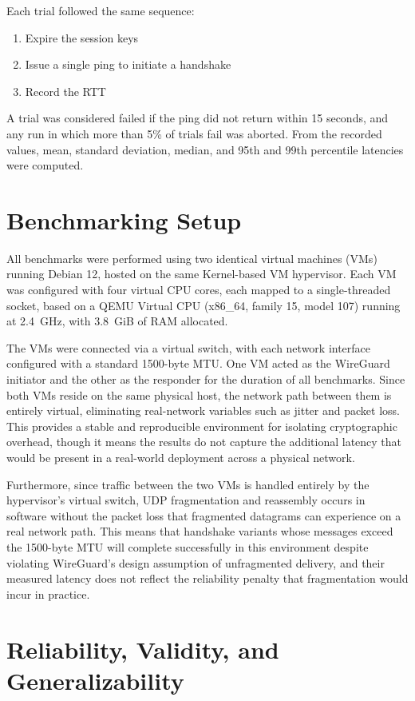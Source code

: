 Each trial followed the same sequence: 
\begin{enumerate}
    \item Expire the session keys
    \item Issue a single ping to initiate a handshake
    \item Record the RTT
\end{enumerate} 
A trial was considered failed if the ping did not return within 15 seconds, and any run in which more than 5\% of trials fail was aborted. From the recorded values, mean, standard deviation, median, and 95th and 99th percentile latencies were computed.


\section{Benchmarking Setup}\label{sec:benchmark}
All benchmarks were performed using two identical virtual machines (VMs) running Debian 12, hosted on the same Kernel-based VM hypervisor. Each VM was configured with four virtual CPU cores, each mapped to a single-threaded socket, based on a QEMU Virtual CPU (x86\_64, family 15, model 107) running at \qty{2.4}{GHz}, with \qty{3.8}{GiB} of RAM allocated. 

The VMs were connected via a virtual switch, with each network interface configured with a standard 1500-byte MTU. One VM acted as the WireGuard initiator and the other as the responder for the duration of all benchmarks. Since both VMs reside on the same physical host, the network path between them is entirely virtual, eliminating real-network variables such as jitter and packet loss. This provides a stable and reproducible environment for isolating cryptographic overhead, though it means the results do not capture the additional latency that would be present in a real-world deployment across a physical network.

Furthermore, since traffic between the two VMs is handled entirely by the hypervisor's virtual switch, UDP fragmentation and reassembly occurs in software without the packet loss that fragmented datagrams can experience on a real network path. This means that handshake variants whose messages exceed the 1500-byte MTU will complete successfully in this environment despite violating WireGuard's design assumption of unfragmented delivery, and their measured latency does not reflect the reliability penalty that fragmentation would incur in practice.


\section{Reliability, Validity, and Generalizability} 

